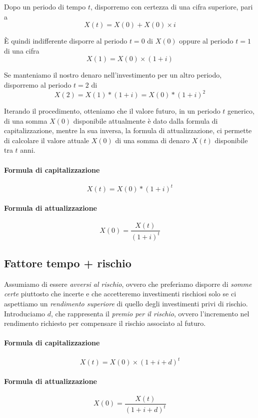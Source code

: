 Dopo un periodo di tempo $t$, disporremo con certezza di una cifra superiore, pari a
\[X(t) = X(0) + X(0) \times i\]

È quindi indifferente disporre al periodo $t=0$ di $X(0)$ oppure al periodo $t=1$ di una cifra
\[X(1) = X(0)\times(1+i)\]

Se manteniamo il nostro denaro nell’investimento per un altro periodo, disporremo al periodo $t=2$ di
\[X(2) = X(1)*(1+i) = X(0)*(1+i)^2\]

Iterando il procedimento, otteniamo che il valore futuro, in un periodo $t$ generico, di una somma $X(0)$
disponibile attualmente è dato dalla formula di capitalizzazione, mentre la sua inversa,
la formula di attualizzazione, ci permette di calcolare il valore attuale $X(0)$ di una somma di denaro $X(t)$ disponibile
tra $t$ anni.
\begin{multicols}{2}
    \paragraph{Formula di capitalizzazione}
    \[X(t) = X(0)*(1+i)^t\]
    
    \paragraph{Formula di attualizzazione}
    \[X(0) = \frac{X(t)}{(1+i)^t}\]
\end{multicols}

\subsection{Fattore tempo + rischio}

Assumiamo di essere \emph{avversi al rischio}, ovvero che preferiamo disporre di \emph{somme certe} piuttosto che incerte
e che accetteremo investimenti rischiosi solo se ci aspettiamo un \emph{rendimento superiore} di quello degli
investimenti privi di rischio. Introduciamo $d$, che rappresenta il \emph{premio per il rischio}, ovvero l’incremento nel rendimento richiesto per compensare il
rischio associato al futuro.
\begin{multicols}{2}
    \paragraph{Formula di capitalizzazione}
    \[X(t) = X(0)\times(1+i+d)^t\]
    
    \paragraph{Formula di attualizzazione}
    \[X(0) = \frac{X(t)}{(1+i+d)^t}\]
\end{multicols}

